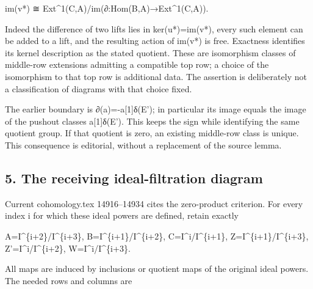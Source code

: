 \documentclass[11pt]{article}
\begin{document}
im(v*)\allowbreak{} ≅ Ext\textasciicircum{}1(C,\allowbreak{}A)\allowbreak{}/\allowbreak{}im(∂:\allowbreak{}Hom(B,\allowbreak{}A)\allowbreak{}\allowbreak{}→Ext\textasciicircum{}1(C,\allowbreak{}A)\allowbreak{})\allowbreak{}.

Indeed the difference of two lifts lies in ker(u*)\allowbreak{}\allowbreak{}=im(v*)\allowbreak{},\allowbreak{} every such element can be added to a lift,\allowbreak{} and the resulting action of im(v*)\allowbreak{} is free. Exactness identifies its kernel description as the stated quotient. These are isomorphism classes of middle-row extensions admitting a compatible top row; a choice of the isomorphism to that top row is additional data. The assertion is deliberately not a classification of diagrams with that choice fixed.

The earlier boundary is ∂(a)\allowbreak{}\allowbreak{}=-a[1]\allowbreak{}δ(E')\allowbreak{}; in particular its image equals the image of the pushout classes a[1]\allowbreak{}δ(E')\allowbreak{}. This keeps the sign while identifying the same quotient group. If that quotient is zero,\allowbreak{} an existing middle-row class is unique. This consequence is editorial,\allowbreak{} without a replacement of the source lemma.

\subsection{5. The receiving ideal-filtration diagram}\label{proofs-8774-9196-the-receiving-ideal-filtration-diagram}

Current cohomology.tex 14916–\allowbreak{}14934 cites the zero-product criterion. For every index i for which these ideal powers are defined,\allowbreak{} retain exactly

A\allowbreak{}=I\textasciicircum{}\{i\allowbreak{}+2\}/\allowbreak{}I\textasciicircum{}\{i\allowbreak{}+3\},\allowbreak{} B\allowbreak{}=I\textasciicircum{}\{i\allowbreak{}+1\}/\allowbreak{}I\textasciicircum{}\{i\allowbreak{}+2\},\allowbreak{} C\allowbreak{}=I\textasciicircum{}i/\allowbreak{}I\textasciicircum{}\{i\allowbreak{}+1\},\allowbreak{} Z\allowbreak{}=I\textasciicircum{}\{i\allowbreak{}+1\}/\allowbreak{}I\textasciicircum{}\{i\allowbreak{}+3\},\allowbreak{} Z'\allowbreak{}=I\textasciicircum{}i/\allowbreak{}I\textasciicircum{}\{i\allowbreak{}+2\},\allowbreak{} W\allowbreak{}=I\textasciicircum{}i/\allowbreak{}I\textasciicircum{}\{i\allowbreak{}+3\}.

All maps are induced by inclusions or quotient maps of the original ideal powers. The needed rows and columns are
\end{document}

